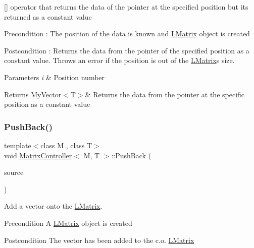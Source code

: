 \mbox{[}\mbox{]} operator that returns the data of the pointer at the specified position but its returned as a constant value 

\begin{DoxyPrecond}{Precondition}
\+: The position of the data is known and \mbox{\hyperlink{class_l_matrix}{L\+Matrix}} object is created 
\end{DoxyPrecond}
\begin{DoxyPostcond}{Postcondition}
\+: Returns the data from the pointer of the specified position as a constant value. Throws an error if the position is out of the \mbox{\hyperlink{class_l_matrix}{L\+Matrix}}\textquotesingle{}s size. 
\end{DoxyPostcond}

\begin{DoxyParams}{Parameters}
{\em i} & Position number \\
\hline
\end{DoxyParams}
\begin{DoxyReturn}{Returns}
My\+Vector$<$\+T$>$\& Returns the data from the pointer at the specific position as a constant value 
\end{DoxyReturn}
\mbox{\label{class_matrix_controller_a5f5411f7f84c53bb02b4f4febb3c4089}} 
\subsubsection{\texorpdfstring{PushBack()}{PushBack()}}
{\footnotesize\ttfamily template$<$class M , class T$>$ \\
void \mbox{\hyperlink{class_matrix_controller}{Matrix\+Controller}}$<$ M, T $>$\+::Push\+Back (\begin{DoxyParamCaption}\item[{const \mbox{\hyperlink{class_my_vector}{My\+Vector}}$<$ T $>$ \&}]{source }\end{DoxyParamCaption})}



Add a vector onto the \mbox{\hyperlink{class_l_matrix}{L\+Matrix}}. 

\begin{DoxyPrecond}{Precondition}
A \mbox{\hyperlink{class_l_matrix}{L\+Matrix}} object is created 
\end{DoxyPrecond}
\begin{DoxyPostcond}{Postcondition}
The vector has been added to the c.\+o. \mbox{\hyperlink{class_l_matrix}{L\+Matrix}}
\end{DoxyPostcond}

